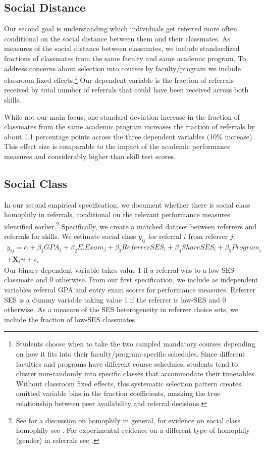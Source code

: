 \documentclass[11pt,a4paper,oneside]{article}
\begin{document}
\subsection{Social Distance}
Our second goal is understanding which individuals get referred more often conditional on the social distance between them and their classmates. As measures of the social distance between classmates, we include standardized fractions of classmates from the same faculty and same academic program. To address concerns about selection into courses by faculty/program we include classroom fixed effects.\footnote{Students choose when to take the two sampled mandatory courses depending on how it fits into their faculty/program-specific schedules. Since different faculties and programs have different course schedules, students tend to cluster non-randomly into specific classes that accommodate their timetables. Without classroom fixed effects, this systematic selection pattern creates omitted variable bias in the fraction coefficients, masking the true relationship between peer availability and referral decisions.} Our dependent variable is the fraction of referrals received by total number of referrals that could have been received across both skills. 

While not our main focus, one standard deviation increase in the fraction of classmates from the same academic program increases the fraction of referrals by about 1.1 percentage points across the three dependent variables (10\% increase). This effect size is comparable to the impact of the academic performance measures and considerably higher than skill test scores.


\subsection{Social Class}
In our second empirical specification, we document whether there is social class homophily in referrals, conditional on the relevant performance measures identified earlier.\footnote{See \citet{mcpherson2001birds} for a discussion on homophily in general, for evidence on social class homophily see \citet{chetty2022social,chetty2022socialb}. For experimental evidence on a different type of homophily (gender) in referrals see \citet{beaman_job_2018}.} Specifically, we create a matched dataset between referrers and referrals for skills. We estimate social class $y_{ij}$ for referral $i$ from referrer $j$: 
\begin{multline}
    y_{ij} = \alpha + \beta_1{GPA}_{j} + \beta_2{E.Exam}_{j} + \beta_3{ReferrerSES}_{i} + \beta_4{ShareSES}_{i} + \beta_5{Program}_{i} \\ +\mathbf{X}_{i}\boldsymbol{\gamma} +  \epsilon_{i}    
\end{multline}
Our binary dependent variable takes value 1 if a referral was to a low-SES classmate and 0 otherwise. From our first specification, we include as independent variables referral GPA and entry exam scores for performance measures. Referrer SES is a dummy variable taking value 1 if the referrer is low-SES and 0 otherwise. As a measure of the SES heterogeneity in referrer choice sets, we include the fraction of low-SES classmates 
\end{document}
